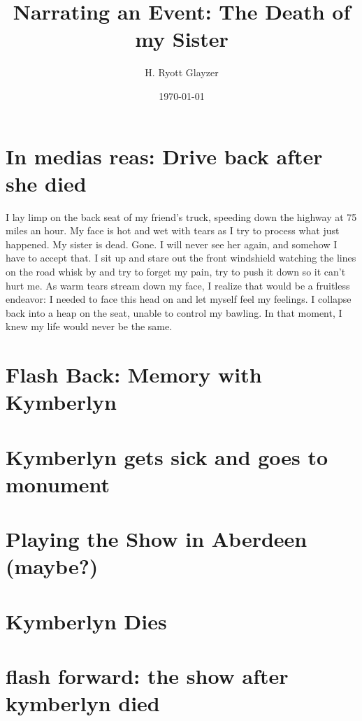 \documentclass[12pt, letterpaper]{article}
\title{Narrating an Event: The Death of my Sister}
\author{H. Ryott Glayzer}
\date{\today}
\begin{document}
\maketitle

\section*{In medias reas: Drive back after she died}
I lay limp on the back seat of my friend's truck,
speeding down the highway at 75 miles an hour.
My face is hot and wet with tears as I try to process what just happened.
My sister is dead.
Gone.
I will never see her again, and somehow I have to accept that.
I sit up and stare out the front windshield watching the lines on the road whisk by
and try to forget my pain, try to push it down so it can't hurt me.
As warm tears stream down my face, I realize that would be a fruitless
endeavor:
I needed to face this head on and let myself feel my feelings.
I collapse back into a heap on the seat, unable to control my bawling.
In that moment, I knew my life would never be the same.

\section*{Flash Back: Memory with Kymberlyn}
% 
% 






\section*{Kymberlyn gets sick and goes to monument}




\section*{Playing the Show in Aberdeen (maybe?)}



\section*{Kymberlyn Dies}




\section*{flash forward: the show after kymberlyn died}
\end{document}
